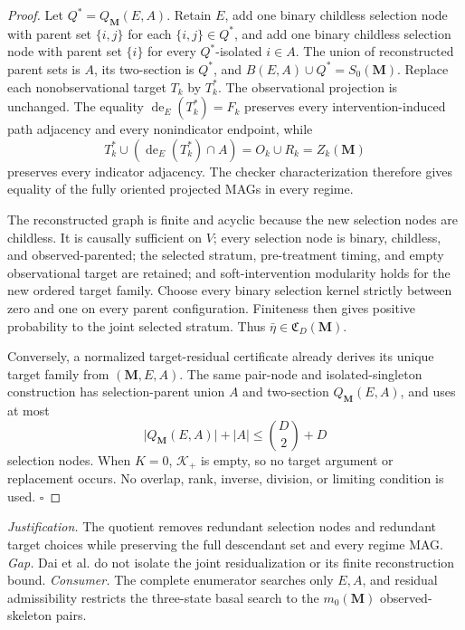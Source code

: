 \documentclass{article}
\begin{document}
\begin{proof}
Let \(Q^*=Q_{\mathbf M}(E,A)\).  Retain \(E\), add one binary childless selection node with parent set \(\{i,j\}\) for each \(\{i,j\}\in Q^*\), and add one binary childless selection node with parent set \(\{i\}\) for every \(Q^*\)-isolated \(i\in A\).  The union of reconstructed parent sets is \(A\), its two-section is \(Q^*\), and \(B(E,A)\cup Q^*=S_0(\mathbf M)\).  Replace each nonobservational target \(T_k\) by \(T_k^*\).  The observational projection is unchanged.  The equality \(\operatorname{de}_E(T_k^*)=F_k\) preserves every intervention-induced path adjacency and every nonindicator endpoint, while
\[
T_k^*\cup(\operatorname{de}_E(T_k^*)\cap A)
=O_k\cup R_k
=Z_k(\mathbf M)
\]
preserves every indicator adjacency.  The checker characterization therefore gives equality of the fully oriented projected MAGs in every regime.

The reconstructed graph is finite and acyclic because the new selection nodes are childless.  It is causally sufficient on \(V\); every selection node is binary, childless, and observed-parented; the selected stratum, pre-treatment timing, and empty observational target are retained; and soft-intervention modularity holds for the new ordered target family.  Choose every binary selection kernel strictly between zero and one on every parent configuration.  Finiteness then gives positive probability to the joint selected stratum.  Thus \(\bar\eta\in\mathfrak C_D(\mathbf M)\).

Conversely, a normalized target-residual certificate already derives its unique target family from \((\mathbf M,E,A)\).  The same pair-node and isolated-singleton construction has selection-parent union \(A\) and two-section \(Q_{\mathbf M}(E,A)\), and uses at most
\[
\lvert Q_{\mathbf M}(E,A)\rvert+\lvert A\rvert
\le \binom D2+D
\]
selection nodes.  When \(K=0\), \(\mathcal K_+\) is empty, so no target argument or replacement occurs.  No overlap, rank, inverse, division, or limiting condition is used. \(\square\)
\end{proof}
\par\smallskip\noindent \textit{Justification.} The quotient removes redundant selection nodes and redundant target choices while preserving the full descendant set and every regime MAG. \textit{Gap.} Dai et al. do not isolate the joint residualization or its finite reconstruction bound. \textit{Consumer.} The complete enumerator searches only \(E,A\), and residual admissibility restricts the three-state basal search to the \(m_0(\mathbf M)\) observed-skeleton pairs.
\end{document}

